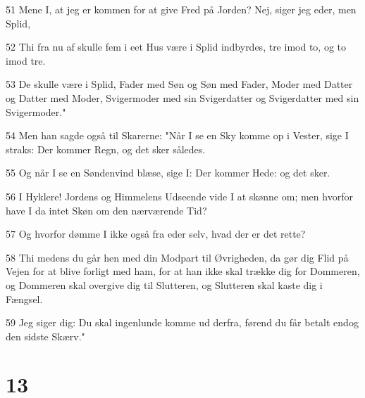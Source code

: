\par 51 Mene I, at jeg er kommen for at give Fred på Jorden? Nej, siger jeg eder, men Splid,
\par 52 Thi fra nu af skulle fem i eet Hus være i Splid indbyrdes, tre imod to, og to imod tre.
\par 53 De skulle være i Splid, Fader med Søn og Søn med Fader, Moder med Datter og Datter med Moder, Svigermoder med sin Svigerdatter og Svigerdatter med sin Svigermoder."
\par 54 Men han sagde også til Skarerne: "Når I se en Sky komme op i Vester, sige I straks: Der kommer Regn, og det sker således.
\par 55 Og når I se en Søndenvind blæse, sige I: Der kommer Hede: og det sker.
\par 56 I Hyklere! Jordens og Himmelens Udseende vide I at skønne om; men hvorfor have I da intet Skøn om den nærværende Tid?
\par 57 Og hvorfor dømme I ikke også fra eder selv, hvad der er det rette?
\par 58 Thi medens du går hen med din Modpart til Øvrigheden, da gør dig Flid på Vejen for at blive forligt med ham, for at han ikke skal trække dig for Dommeren, og Dommeren skal overgive dig til Slutteren, og Slutteren skal kaste dig i Fængsel.
\par 59 Jeg siger dig: Du skal ingenlunde komme ud derfra, førend du får betalt endog den sidste Skærv."

\chapter{13}

